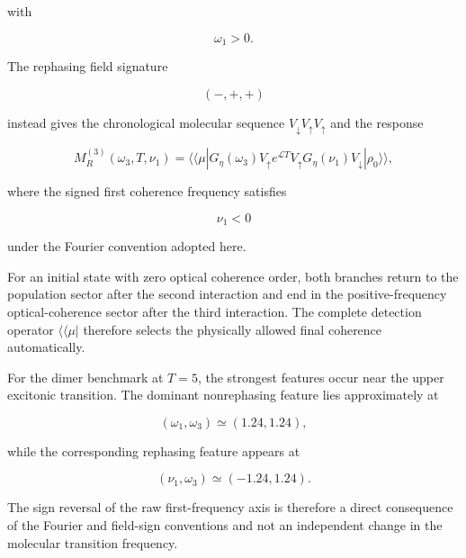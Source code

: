 \documentclass[11pt]{article}
\begin{document}
with

\begin{equation}
\omega_1>0.
\end{equation}

The rephasing field signature

\begin{equation}
(-,+,+)
\end{equation}

instead gives the chronological molecular sequence
$V_{\downarrow}V_{\uparrow}V_{\uparrow}$ and the response

\begin{equation}
M_R^{(3)}
(\omega_3,T,\nu_1)
=
\langle\!\langle\mu|
G_\eta(\omega_3)
V_{\uparrow}
e^{\mathcal{L}T}
V_{\uparrow}
G_\eta(\nu_1)
V_{\downarrow}
|\rho_0\rangle\!\rangle ,
\label{eq:M3_R}
\end{equation}

where the signed first coherence frequency satisfies

\begin{equation}
\nu_1<0
\end{equation}

under the Fourier convention adopted here.

For an initial state with zero optical coherence order, both branches
return to the population sector after the second interaction and end in
the positive-frequency optical-coherence sector after the third
interaction.  The complete detection operator
$\langle\!\langle\mu|$ therefore selects the physically allowed final
coherence automatically.

For the dimer benchmark at $T=5$, the strongest features occur near the
upper excitonic transition.  The dominant nonrephasing feature lies
approximately at

\begin{equation}
(\omega_1,\omega_3)
\simeq
(1.24,1.24),
\end{equation}

while the corresponding rephasing feature appears at

\begin{equation}
(\nu_1,\omega_3)
\simeq
(-1.24,1.24).
\end{equation}

The sign reversal of the raw first-frequency axis is therefore a direct
consequence of the Fourier and field-sign conventions and not an
independent change in the molecular transition frequency.
\end{document}
